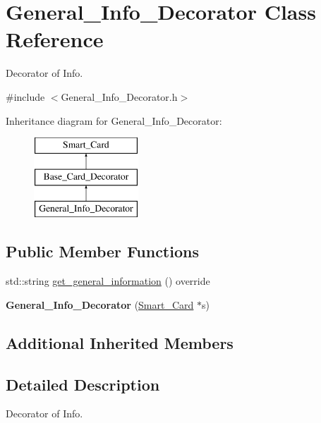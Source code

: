 \hypertarget{classGeneral__Info__Decorator}{}\section{General\+\_\+\+Info\+\_\+\+Decorator Class Reference}
\label{classGeneral__Info__Decorator}


Decorator of Info.  




{\ttfamily \#include $<$General\+\_\+\+Info\+\_\+\+Decorator.\+h$>$}

Inheritance diagram for General\+\_\+\+Info\+\_\+\+Decorator\+:\begin{figure}[H]
\begin{center}
\leavevmode
\includegraphics[height=3.000000cm]{classGeneral__Info__Decorator}
\end{center}
\end{figure}
\subsection*{Public Member Functions}
\begin{DoxyCompactItemize}
\item 
std\+::string \mbox{\hyperlink{classGeneral__Info__Decorator_a8bc8c352cf14028a9ef2c3e7dce90db7}{get\+\_\+general\+\_\+information}} () override
\item 
\mbox{\label{classGeneral__Info__Decorator_acb5b231e3272f6c97e05969d5725fc94}} 
{\bfseries General\+\_\+\+Info\+\_\+\+Decorator} (\mbox{\hyperlink{classSmart__Card}{Smart\+\_\+\+Card}} $\ast$s)
\end{DoxyCompactItemize}
\subsection*{Additional Inherited Members}


\subsection{Detailed Description}
Decorator of Info. 

